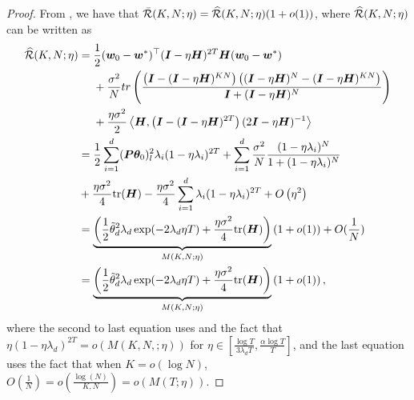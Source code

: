 \begin{proof}


From , we have that $\Bar{\mathcal{R}}(K, N;\eta) = \widehat{\mathcal{R}}(K, N;\eta)(1 + o(1))$, where $\widehat{\mathcal{R}}(K, N;\eta)$ can be written as
    \begin{align}
    \widehat{\mathcal{R}}(K, N;\eta) &= \frac{1}{2}({\bm{w}}_0 - {\bm{w}}^*)^{\top} ({\bm{I}}-\eta{\bm{H}})^{2T}{\bm{H}} ({\bm{w}}_0 - {\bm{w}}^*)\notag\\
    &~~~~+\frac{\sigma^2}{N} tr\left(\frac{\left({\bm{I}} -({\bm{I}} -\eta{\bm{H}})^{KN}\right)\left(({\bm{I}} -\eta{\bm{H}})^{N} -({\bm{I}} -\eta{\bm{H}})^{KN}\right)}{{\bm{I}} + ({\bm{I}} -\eta{\bm{H}})^N}\right)\notag \\
    &~~~~+\frac{\eta\sigma^2}{2}\left\langle {\bm{H}},\left({\bm{I}} - ({\bm{I}} - \eta {\bm{H}})^{2T}\right)(2{\bm{I}}-\eta{\bm{H}})^{-1}\right\rangle \notag\\
    &= \frac{1}{2} \sum_{i=1}^d ({\bm{P}}{\bm{\theta}}_{0})_l^2 \lambda_i (1-\eta\lambda_i)^{2T} +\sum_{i=1}^d\frac{\sigma^2}{N}\frac{(1-\eta\lambda_i)^N}{1+ (1-\eta\lambda_i)^N}\notag \\
    &+ \frac{\eta\sigma^2}{4}\mathrm{tr}({\bm{H}})- \frac{\eta\sigma^2}{4}\sum_{i=1}^d\lambda_i(1-\eta\lambda_i)^{2T}+ O\left(\eta^2\right)\notag\\
    &=\underbrace{\left(\frac{1}{2}\Tilde{\theta}_d^2 \lambda_d \exp(-2\lambda_d \eta T) + \frac{\eta\sigma^2}{4}\mathrm{tr}({\bm{H}})\right)}_{M(K,N;\eta)}\left(1 + o(1)\right)  + O(\frac{1}{N}) \notag\\
    &=\underbrace{\left(\frac{1}{2}\Tilde{\theta}_d^2 \lambda_d \exp(-2\lambda_d \eta T) + \frac{\eta\sigma^2}{4}\mathrm{tr}({\bm{H}})\right)}_{M(K,N;\eta)}\left(1 + o(1)\right)\label{equ:convex-l-estmate-small-k},
\end{align}
where the second to last equation uses  and the fact that $\eta (1-\eta \lambda_d)^{2T} = o\left(M(K,N,;\eta)\right)$ for $\eta  \in [\frac{\log T}{3\lambda_d T}, \frac{\alpha\log T}{T}] $, and the last equation uses the fact that when $K = o(\log N)$, $O\left(\frac{1}{N}\right) = o\left(\frac{\log (N)}{K,N}\right) = o\left(M(T;\eta)\right)$.
\end{proof}

